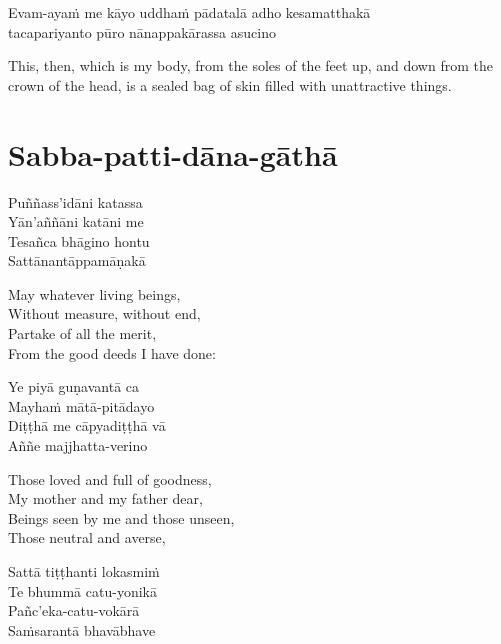 Evam-ayaṁ me kāyo uddhaṁ pādatalā adho kesamatthakā\\
tacapariyanto pūro nānappakārassa asucino

\begin{english}
  This, then, which is my body, from the soles of the feet up, and down from the crown of the head, is a sealed bag of skin filled with unattractive things. 
\end{english}

\section{Sabba-patti-dāna-gāthā}



\begin{leader}
\end{leader}

Puññass'idāni katassa\\
Yān'aññāni katāni me\\
Tesañca bhāgino hontu\\
Sattānantāppamāṇakā

\begin{english}
  May whatever living beings,\\
  Without measure, without end,\\
  Partake of all the merit,\\
  From the good deeds I have done:
\end{english}

Ye piyā guṇavantā ca\\
Mayhaṁ mātā-pitādayo\\
Diṭṭhā me cāpyadiṭṭhā vā\\
Aññe majjhatta-verino

\begin{english}
  Those loved and full of goodness,\\
  My mother and my father dear,\\
  Beings seen by me and those unseen,\\
  Those neutral and averse,
\end{english}

Sattā tiṭṭhanti lokasmiṁ\\
Te bhummā catu-yonikā\\
Pañc'eka-catu-vokārā\\
Saṁsarantā bhavābhave

